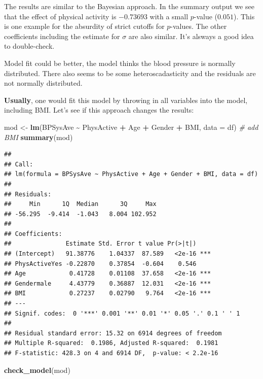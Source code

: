 \documentclass[
]{book}
\newenvironment{Shaded}{\begin{snugshade}}{\end{snugshade}}
\newcommand{\AttributeTok}[1]{\textcolor[rgb]{0.13,0.29,0.53}{#1}}
\newcommand{\CommentTok}[1]{\textcolor[rgb]{0.56,0.35,0.01}{\textit{#1}}}
\newcommand{\FunctionTok}[1]{\textcolor[rgb]{0.13,0.29,0.53}{\textbf{#1}}}
\newcommand{\NormalTok}[1]{#1}
\newcommand{\OtherTok}[1]{\textcolor[rgb]{0.56,0.35,0.01}{#1}}
\newcommand{\SpecialCharTok}[1]{\textcolor[rgb]{0.81,0.36,0.00}{\textbf{#1}}}
\begin{document}
The results are similar to the Bayesian approach.
In the summary output we see that the effect of physical activity is \(-0.73693\)
with a small \(p\)-value (\(0.051\)). This is one example for the absurdity of strict cutoffs
for \(p\)-values. The other coefficients including the estimate for \(\sigma\) are also similar.
It's alsways a good idea to double-check.

Model fit could be better, the model thinks the blood pressure is normally distributed.
There also seems to be some heteroscadasticity and the residuals are not normally distributed.

\textbf{Usually}, one would fit this model by throwing in all variables into the model, including BMI.
Let's see if this approach changes the results:

\begin{Shaded}
\begin{Highlighting}[]
\NormalTok{mod }\OtherTok{\textless{}{-}} \FunctionTok{lm}\NormalTok{(BPSysAve }\SpecialCharTok{\textasciitilde{}}\NormalTok{ PhysActive }\SpecialCharTok{+}\NormalTok{ Age }\SpecialCharTok{+}\NormalTok{ Gender  }\SpecialCharTok{+}\NormalTok{ BMI, }\AttributeTok{data =}\NormalTok{ df) }\CommentTok{\# add BMI}
\FunctionTok{summary}\NormalTok{(mod)}
\end{Highlighting}
\end{Shaded}

\begin{verbatim}
## 
## Call:
## lm(formula = BPSysAve ~ PhysActive + Age + Gender + BMI, data = df)
## 
## Residuals:
##     Min      1Q  Median      3Q     Max 
## -56.295  -9.414  -1.043   8.004 102.952 
## 
## Coefficients:
##               Estimate Std. Error t value Pr(>|t|)    
## (Intercept)   91.38776    1.04337  87.589   <2e-16 ***
## PhysActiveYes -0.22870    0.37854  -0.604    0.546    
## Age            0.41728    0.01108  37.658   <2e-16 ***
## Gendermale     4.43779    0.36887  12.031   <2e-16 ***
## BMI            0.27237    0.02790   9.764   <2e-16 ***
## ---
## Signif. codes:  0 '***' 0.001 '**' 0.01 '*' 0.05 '.' 0.1 ' ' 1
## 
## Residual standard error: 15.32 on 6914 degrees of freedom
## Multiple R-squared:  0.1986, Adjusted R-squared:  0.1981 
## F-statistic: 428.3 on 4 and 6914 DF,  p-value: < 2.2e-16
\end{verbatim}

\begin{Shaded}
\begin{Highlighting}[]
\FunctionTok{check\_model}\NormalTok{(mod)}
\end{Highlighting}
\end{Shaded}
\end{document}
